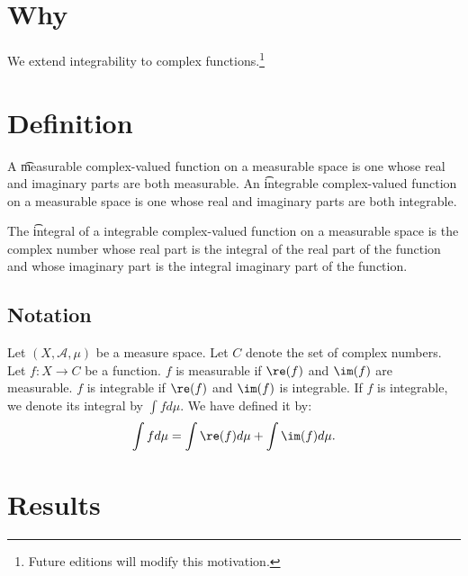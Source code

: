 

\section*{Why}

We extend integrability to complex functions.\footnote{Future editions will modify this motivation.}

\section*{Definition}

A \t{measurable} complex-valued function on a measurable space is one whose real and imaginary parts are both measurable.
An \t{integrable} complex-valued function on a measurable space is one whose real and imaginary parts are both integrable.

The \t{integral} of a integrable complex-valued function on a measurable space is the complex number whose real part is the integral of the real part of the function and whose imaginary part is the integral imaginary part of the function.

\subsection*{Notation}

Let $(X, \mathcal{A} , \mu )$
be a measure space.
Let $C$ denote the set
of complex numbers.
Let $f: X \to C$
be a function.
$f$ is measurable
if $\re(f)$ and $\im(f)$
are measurable.
$f$ is integrable if
$\re(f)$ and $\im(f)$
is integrable.
If $f$ is integrable,
we denote its integral
by $\int f d\mu $.
We have defined it by:
    \[
\int  f d\mu  = \int \re(f)d\mu  + \int  \im(f) d\mu .
    \]

\section*{Results}

